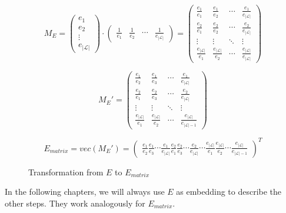 \begin{figure}[h]
	\centering
	$$ M_E = \begin{pmatrix}
		e_1\\
        e_2\\
        \vdots\\
        e_{|\mathcal{L}|}
     \end{pmatrix}
     \cdot
     \begin{pmatrix}
     	\frac{1}{e_1} & \frac{1}{e_2} & \cdots & \frac{1}{e_{|\mathcal{L}|}}
     \end{pmatrix} = 
	 \begin{pmatrix}
		\frac{e_1}{e_1} & \frac{e_1}{e_2} & \cdots & \frac{e_1}{e_{|\mathcal{L}|}}\\
        \frac{e_2}{e_1} & \frac{e_2}{e_2} & \cdots & \frac{e_2}{e_{|\mathcal{L}|}}\\
        \vdots & \vdots & \ddots & \vdots\\
        \frac{e_{|\mathcal{L}|}}{e_1} & \frac{e_{|\mathcal{L}|}}{e_2} & \cdots & \frac{e_{|\mathcal{L}|}}{e_{|\mathcal{L}|}}
     \end{pmatrix}     
     $$
     
     $$
	 M_E' =   
	 \begin{pmatrix}
		\frac{e_1}{e_2} & \frac{e_1}{e_3} & \cdots & \frac{e_1}{e_{|\mathcal{L}|}}\\
        \frac{e_2}{e_1} & \frac{e_2}{e_3} & \cdots & \frac{e_2}{e_{|\mathcal{L}|}}\\
        \vdots & \vdots & \ddots & \vdots\\
        \frac{e_{|\mathcal{L}|}}{e_1} & \frac{e_{|\mathcal{L}|}}{e_2} & \cdots & \frac{e_{|\mathcal{L}|}}{e_{|\mathcal{L}|-1}}
     \end{pmatrix}  
     $$
     
     $$
     E_{matrix} = vec(M_E') = 
     \begin{pmatrix}
     	\frac{e_1}{e_2}  \frac{e_1}{e_3}  \cdots  \frac{e_1}{e_{|\mathcal{L}|}}  \frac{e_2}{e_1}  \frac{e_2}{e_3}  \cdots \frac{e_2}{e_{|\mathcal{L}|}}  \cdots  \frac{e_{|\mathcal{L}|}}{e_1} \frac{e_{|\mathcal{L}|}}{e_2}  \cdots  \frac{e_{|\mathcal{L}|}}{e_{|\mathcal{L}|-1}}
     \end{pmatrix}^T
     $$
     
	\caption{Transformation from $E$ to $E_{matrix}$}%
	\label{fig:transform1}
\end{figure}

In the following chapters, we will always use $E$ as embedding to describe the other steps. They work analogously for $E_{matrix}$. \\

